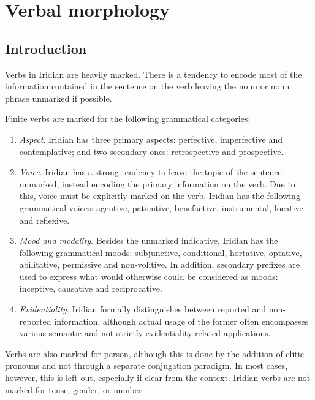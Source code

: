 \chapter{Verbal morphology}

\section{Introduction}


Verbs in Iridian are heavily marked. There is a tendency to encode most of the information contained in the sentence on the verb leaving the noun or noun phrase unmarked if possible.

\par Finite verbs are marked for the following grammatical categories:
\begin{enumerate}[nosep]
	\item \textit{Aspect}. Iridian has three primary aspects: perfective, imperfective and contemplative; and two secondary ones: retrospective and prospective.
	\item \textit{Voice}. Iridian has a strong tendency to leave the topic of the sentence unmarked, instead encoding the primary information on the verb. Due to this, voice must be explicitly marked on the verb. Iridian has the following grammatical voices: agentive, patientive, benefactive, instrumental, locative and reflexive.
	\item \textit{Mood and modality}. Besides the unmarked indicative, Iridian has the following grammatical moods: subjunctive, conditional, hortative, optative, abilitative, permissive and non-volitive. In addition, secondary prefixes are used to express what would otherwise could be considered as moods: inceptive, causative and reciprocative.
	\item \textit{Evidentiality}. Iridian formally distinguishes between reported and non-reported information, although actual usage of the former often encompasses various semantic and not strictly evidentiality-related applications.
\end{enumerate}

Verbs are also marked for person, although this is done by the addition of clitic pronouns and not through a separate conjugation paradigm. In most cases, however, this is left out, especially if clear from the context. Iridian verbs are not marked for tense, gender, or number.

